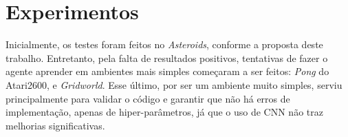 %
%
%
%

\section{Experimentos}
\label{sec:exp}

Inicialmente, os testes foram feitos no \textit{Asteroids}, conforme a proposta deste trabalho.
Entretanto, pela falta de resultados positivos, tentativas de fazer o agente aprender em ambientes mais simples começaram a ser feitos:
\textit{Pong} do Atari2600, e \textit{Gridworld}.
Esse último, por ser um ambiente muito simples, serviu principalmente para validar o código e garantir que não há erros de implementação, apenas de hiper-parâmetros, já que o uso de CNN não traz melhorias significativas.

